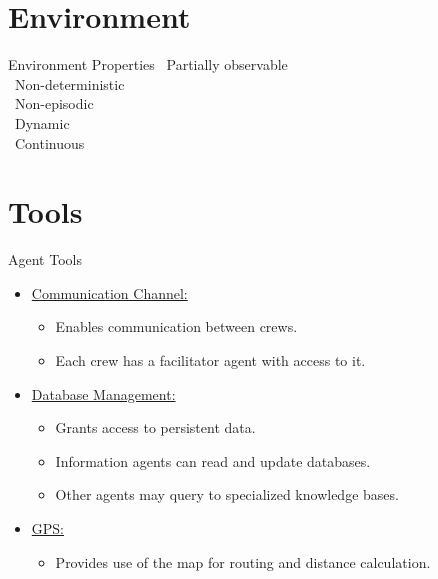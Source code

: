 \documentclass{beamer}
\begin{document}
\section{Environment}
\begin{frame}{Environment Properties}
            \vspace{0.5em}
         \hspace{3em}       \faEye\ Partially observable\\
\vspace{0.5em}
         \hspace{3em}       \faQuestionCircle\ Non-deterministic\\
\vspace{0.5em}
          \hspace{3em}     \faLink\ Non-episodic\\
\vspace{0.5em}
         \hspace{3em}    \faRefresh\ Dynamic\\
\vspace{0.5em}
       \hspace{3em}          \faMapMarker\ Continuous\\
\vspace{0.5em}
\end{frame}

\section{Tools}
\begin{frame}{Agent Tools}
    \begin{itemize}
        \item \underline{Communication Channel:}
        \begin{itemize}
            \item Enables \alert{communication} between crews.
            \item Each crew has a \alert{facilitator} agent with access to it.
        \end{itemize}
        \item \underline{Database Management:}
        \begin{itemize}
            \item Grants access to \alert{persistent} data.
            \item \alert{Information} agents can read and update databases.
            \item Other agents may query to \alert{specialized knowledge} bases.
        \end{itemize}
        \item \underline{GPS:}
        \begin{itemize}
            \item Provides use of the map for \alert{routing} and \alert{distance calculation}.
        \end{itemize}
    \end{itemize}
\end{frame}
\end{document}
